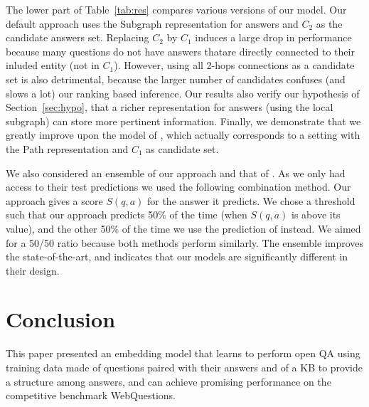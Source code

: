 \documentclass[runningheads,a4paper]{llncs}
\newcommand{\wq}{{\sc WebQuestions}\xspace}
\begin{document}
The lower part of Table~\ref{tab:res} compares various versions of our
model. Our default approach uses the Subgraph representation for
answers and $C_2$ as the candidate answers set.
Replacing $C_2$ by $C_1$ induces a large drop in performance because
many questions do not have answers thatare directly connected to their
inluded entity (not in $C_1$). However, using all 2-hops connections
as a candidate set is also detrimental, because the larger number of
candidates confuses (and slows a lot) our ranking based inference.
Our results also verify our hypothesis of Section~\ref{sec:hypo},
that a richer representation for answers (using the local subgraph)
can store more pertinent information.
Finally, we demonstrate that we greatly improve upon the model of
\cite{bordes2014open}, which actually corresponds to a setting with
the Path representation and $C_1$ as candidate set.

We also considered an ensemble of our approach and that of
\cite{berant2014semantic}.  As we only had access to their test
predictions we used the following combination method. Our approach
gives a score $S(q,a)$ for the answer it predicts. We chose a
threshold such that our approach predicts 50\% of the time (when
$S(q,a)$ is above its value), and the other 50\% of the time we
use the prediction of \cite{berant2014semantic} instead. 
We aimed for a 50/50 ratio because both methods perform similarly.
The ensemble improves the state-of-the-art, and indicates that
our models are significantly different in their design.

\section{Conclusion}
This paper presented an embedding model that learns to perform open QA
using training data made of questions paired with their answers and of
a KB to provide a structure among answers, and can achieve
promising performance on the competitive benchmark \wq.




\end{document}
